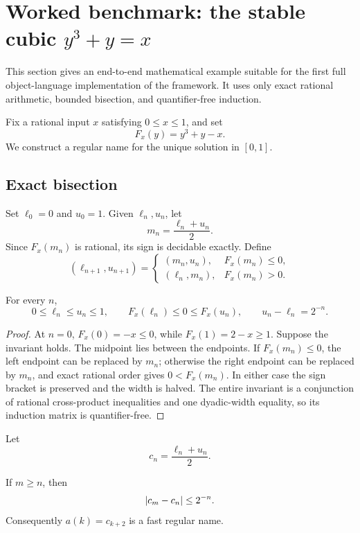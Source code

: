 \section{Worked benchmark: the stable cubic \(y^3+y=x\)}

This section gives an end-to-end mathematical example suitable for the first
full object-language implementation of the framework.  It uses only exact
rational arithmetic, bounded bisection, and quantifier-free induction.

Fix a rational input \(x\) satisfying \(0\le x\le1\), and set
\[
       F_x(y)=y^3+y-x.
\]
We construct a regular name for the unique solution in \([0,1]\).

\subsection{Exact bisection}

Set \(\ell_0=0\) and \(u_0=1\).  Given \(\ell_n,u_n\), let
\[
      m_n=\frac{\ell_n+u_n}{2}.
\]
Since \(F_x(m_n)\) is rational, its sign is decidable exactly.  Define
\[
(\ell_{n+1},u_{n+1})=
\begin{cases}
 (m_n,u_n),&F_x(m_n)\le0,\\
 (\ell_n,m_n),&F_x(m_n)>0.
\end{cases}
\]

\begin{lemma}
For every \(n\),
\[
  0\le\ell_n\le u_n\le1,\qquad
  F_x(\ell_n)\le0\le F_x(u_n),\qquad
  u_n-\ell_n=2^{-n}.
\]
\end{lemma}

\begin{proof}
At \(n=0\), \(F_x(0)=-x\le0\), while
\(F_x(1)=2-x\ge1\).  Suppose the invariant holds.  The midpoint lies between
the endpoints.  If \(F_x(m_n)\le0\), the left endpoint can be replaced by
\(m_n\); otherwise the right endpoint can be replaced by \(m_n\), and exact
rational order gives \(0<F_x(m_n)\).  In either case the sign bracket is
preserved and the width is halved.  The entire invariant is a conjunction of
rational cross-product inequalities and one dyadic-width equality, so its
induction matrix is quantifier-free.
\end{proof}

Let
\[
        c_n=\frac{\ell_n+u_n}{2}.
\]

\begin{lemma}[Regularity]
If \(m\ge n\), then
\[
          \lvert c_m-c_n\rvert\le 2^{-n}.
\]
Consequently \(a(k)=c_{k+2}\) is a fast regular name.
\end{lemma}

